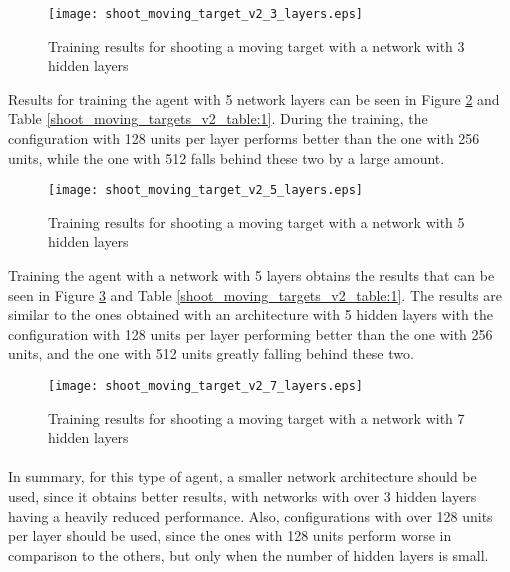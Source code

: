 \begin{figure}
    \begin{center}
        \texttt{[image: shoot\_moving\_target\_v2\_3\_layers.eps]}
        \caption{Training results for shooting a moving target with a network with 3 hidden layers}
        \label{train_results_shoot_v2_3_layers}
    \end{center}
\end{figure}

Results for training the agent with 5 network layers can be seen in Figure \ref{train_results_shoot_v2_5_layers} and Table \ref{shoot_moving_targets_v2_table:1}. During the training, the configuration with 128 units per layer performs better than the one with 256 units, while the one with 512 falls behind these two by a large amount.

\begin{figure}
    \begin{center}
        \texttt{[image: shoot\_moving\_target\_v2\_5\_layers.eps]}
        \caption{Training results for shooting a moving target with a network with 5 hidden layers}
        \label{train_results_shoot_v2_5_layers}
    \end{center}
\end{figure}

Training the agent with a network with 5 layers obtains the results that can be seen in Figure \ref{train_results_shoot_v2_7_layers} and Table \ref{shoot_moving_targets_v2_table:1}. The results are similar to the ones obtained with an architecture with 5 hidden layers with the configuration with 128 units per layer performing better than the one with 256 units, and the one with 512 units greatly falling behind these two.

\begin{figure}
    \begin{center}
        \texttt{[image: shoot\_moving\_target\_v2\_7\_layers.eps]}
        \caption{Training results for shooting a moving target with a network with 7 hidden layers}
        \label{train_results_shoot_v2_7_layers}
    \end{center}
\end{figure}


\paragraph{}
In summary, for this type of agent, a smaller network architecture should be used, since it obtains better results, with networks with over 3 hidden layers having a heavily reduced performance. Also, configurations with over 128 units per layer should be used, since the ones with 128 units perform worse in comparison to the others, but only when the number of hidden layers is small.

